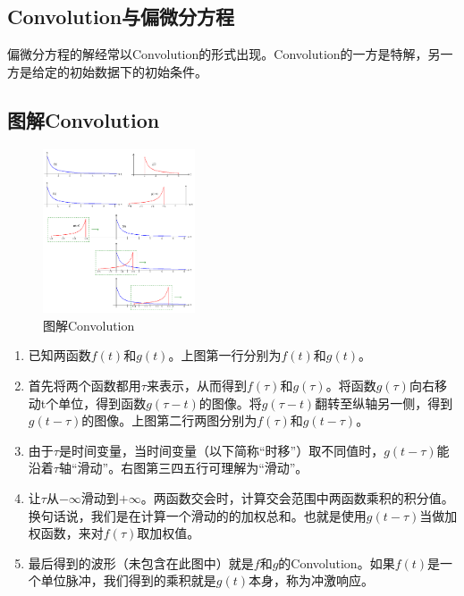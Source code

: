 \subsection{Convolution与偏微分方程}
偏微分方程的解经常以Convolution的形式出现。Convolution的一方是特解，另一方是给定的初始数据下的初始条件。
\subsection{图解Convolution}
\begin{figure}[H]
	\centering
	\includegraphics[width=0.4\textwidth]{assets/Convolution.png}
	\caption{图解Convolution}
\end{figure}

\begin{enumerate}
	\item 已知两函数$f(t)$和$g(t)$。上图第一行分别为$f(t)$和$g(t)$。
	\item 首先将两个函数都用$\tau$来表示，从而得到$f(\tau)$和$g(\tau)$。将函数$g(\tau)$向右移动t个单位，得到函数$g(\tau-t)$的图像。将$g(\tau-t)$翻转至纵轴另一侧，得到$g(t-\tau)$的图像。上图第二行两图分别为$f(\tau)$和$g(t-\tau)$。
	\item 由于$\tau$是时间变量，当时间变量（以下简称“时移”）取不同值时，$g(t-\tau)$能沿着$\tau$轴“滑动”。右图第三四五行可理解为“滑动”。
	\item 让$\tau$从$-∞$滑动到$+∞$。两函数交会时，计算交会范围中两函数乘积的积分值。换句话说，我们是在计算一个滑动的的加权总和。也就是使用$g(t-\tau )$当做加权函数，来对$f(\tau)$取加权值。
	\item 最后得到的波形（未包含在此图中）就是$f$和$g$的Convolution。如果$f(t)$是一个单位脉冲，我们得到的乘积就是$g(t)$本身，称为冲激响应。
\end{enumerate}

